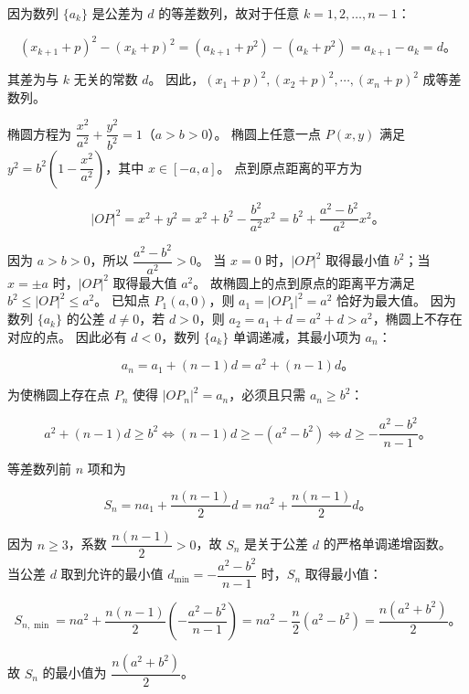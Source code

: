 \begin{answer}
因为数列 $\{a_k\}$ 是公差为 $d$ 的等差数列，故对于任意 $k = 1, 2, \dots, n-1$：

\nopagebreak[4]
\[
(x_{k+1} + p)^2 - (x_k + p)^2 = (a_{k+1} + p^2) - (a_k + p^2) = a_{k+1} - a_k = d\mbox{。}
\]

其差为与 $k$ 无关的常数 $d$。
因此，$(x_1 + p)^2, (x_2 + p)^2, \cdots, (x_n + p)^2$ 成等差数列。


椭圆方程为 $\dfrac{x^2}{a^2} + \dfrac{y^2}{b^2} = 1$（$a > b > 0$）。
椭圆上任意一点 $P(x, y)$ 满足 $y^2 = b^2\left(1 - \dfrac{x^2}{a^2}\right)$，其中 $x \in [-a, a]$。
点到原点距离的平方为

\nopagebreak[4]
\[
|OP|^2 = x^2 + y^2 = x^2 + b^2 - \dfrac{b^2}{a^2}x^2 = b^2 + \dfrac{a^2 - b^2}{a^2}x^2\mbox{。}
\]

因为 $a > b > 0$，所以 $\dfrac{a^2 - b^2}{a^2} > 0$。
当 $x = 0$ 时，$|OP|^2$ 取得最小值 $b^2$；当 $x = \pm a$ 时，$|OP|^2$ 取得最大值 $a^2$。
故椭圆上的点到原点的距离平方满足 $b^2 \leqslant |OP|^2 \leqslant a^2$。
已知点 $P_1(a, 0)$，则 $a_1 = |OP_1|^2 = a^2$ 恰好为最大值。
因为数列 $\{a_k\}$ 的公差 $d \ne 0$，若 $d > 0$，则 $a_2 = a_1 + d = a^2 + d > a^2$，椭圆上不存在对应的点。
因此必有 $d < 0$，数列 $\{a_k\}$ 单调递减，其最小项为 $a_n$：

\nopagebreak[4]
\[
a_n = a_1 + (n - 1)d = a^2 + (n - 1)d\mbox{。}
\]

为使椭圆上存在点 $P_n$ 使得 $|OP_n|^2 = a_n$，必须且只需 $a_n \geqslant b^2$：

\nopagebreak[4]
\[
a^2 + (n - 1)d \geqslant b^2 \iff (n - 1)d \geqslant -(a^2 - b^2) \iff d \geqslant -\dfrac{a^2 - b^2}{n - 1}\mbox{。}
\]

等差数列前 $n$ 项和为

\nopagebreak[4]
\[
S_n = na_1 + \dfrac{n(n - 1)}{2}d = na^2 + \dfrac{n(n - 1)}{2}d\mbox{。}
\]

因为 $n \geqslant 3$，系数 $\dfrac{n(n - 1)}{2} > 0$，故 $S_n$ 是关于公差 $d$ 的严格单调递增函数。
当公差 $d$ 取到允许的最小值 $d_{\min} = -\dfrac{a^2 - b^2}{n - 1}$ 时，$S_n$ 取得最小值：

\nopagebreak[4]
\[
S_{n,\min} = na^2 + \dfrac{n(n - 1)}{2}\left(-\dfrac{a^2 - b^2}{n - 1}\right) = na^2 - \dfrac{n}{2}(a^2 - b^2) = \dfrac{n(a^2 + b^2)}{2}\mbox{。}
\]

故 $S_n$ 的最小值为 $\dfrac{n(a^2 + b^2)}{2}$。




\end{answer}